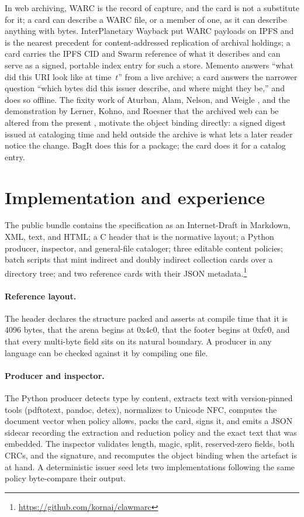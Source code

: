 \documentclass[sigconf]{acmart}
\begin{document}
In web archiving, WARC \cite{ISO:2017} is the record of capture, and the card
is not a substitute for it; a card can describe a WARC file, or a member of
one, as it can describe anything with bytes. InterPlanetary Wayback
\cite{Alam:2016} put WARC payloads on IPFS and is the nearest precedent for
content-addressed replication of archival holdings; a card carries the IPFS
CID and Swarm reference of what it describes and can serve as a signed,
portable index entry for such a store. Memento \cite{VanDeSompel:2013} answers
``what did this URI look like at time~$t$'' from a live archive; a card
answers the narrower question ``which bytes did this issuer describe, and where
might they be,'' and does so offline. The fixity work of Aturban, Alam,
Nelson, and Weigle \cite{Aturban:2019}, and the demonstration by Lerner, Kohno,
and Roesner that the archived web can be altered from the present
\cite{Lerner:2017}, motivate the object binding directly: a signed digest
issued at cataloging time and held outside the archive is what lets a later
reader notice the change. BagIt \cite{Kunze:2018} does this for a package;
the card does it for a catalog entry.

\section{Implementation and experience}
\label{sec:impl}

The public bundle contains the specification as an Internet-Draft in Markdown,
XML, text, and HTML; a C header that is the normative layout; a Python
producer, inspector, and general-file cataloger; three editable content
policies; batch scripts that mint indirect and doubly indirect collection
cards over a directory tree; and two reference cards with their JSON
metadata.\footnote{\url{https://github.com/kornai/clawmarc}}

\paragraph{Reference layout.} The header declares the structure packed and
asserts at compile time that it is 4096 bytes, that the arena begins at 0x4c0,
that the footer begins at 0xfc0, and that every multi-byte field sits on its
natural boundary. A producer in any language can be checked against it by
compiling one file.

\paragraph{Producer and inspector.} The Python producer detects type by
content, extracts text with version-pinned tools (pdftotext, pandoc, detex),
normalizes to Unicode NFC, computes the document vector when policy allows,
packs the card, signs it, and emits a JSON sidecar recording the extraction
and reduction policy and the exact text that was embedded. The inspector
validates length, magic, split, reserved-zero fields, both CRCs, and the
signature, and recomputes the object binding when the artefact is at hand. A
deterministic issuer seed lets two implementations following the same policy
byte-compare their output.
\end{document}
